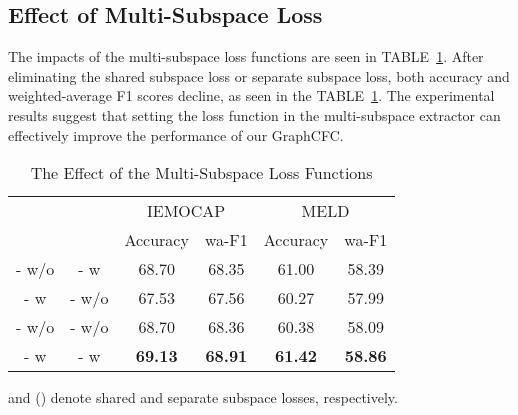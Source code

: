 \documentclass[lettersize,journal]{IEEEtran}
\begin{document}
\subsection{Effect of Multi-Subspace Loss}
The impacts of the multi-subspace loss functions are seen in TABLE~\ref{tab:muti-subspace}. After eliminating the shared subspace loss or separate subspace loss, both accuracy and weighted-average F1 scores decline, as seen in the TABLE~\ref{tab:muti-subspace}. The experimental results suggest that setting the loss function in the multi-subspace extractor can effectively improve the performance of our GraphCFC.
\begin{table}[htbp]
\centering
\renewcommand{\arraystretch}{1.0}
\setlength{\tabcolsep}{7pt}
\caption{The Effect of the Multi-Subspace Loss Functions}
\begin{threeparttable}
\begin{tabular}{c|c|cc||cc}
\hline
\multicolumn{1}{c|}{\multirow{2}[0]{*}{}} & \multicolumn{1}{c|}{\multirow{2}[0]{*}{}}& \multicolumn{2}{c||}{IEMOCAP} & \multicolumn{2}{c}{MELD} \\
\cline{3-6}
& & Accuracy & wa-F1 & Accuracy & wa-F1 \\
\hline
- w/o & - w & 68.70  & 68.35  & 61.00  & 58.39  \\
- w & - w/o & 67.53  & 67.56  & 60.27  & 57.99  \\
- w/o & - w/o & 68.70  & 68.36  & 60.38  & 58.09  \\
\hline
- w & - w & \textbf{69.13}  & \textbf{68.91}  & \textbf{61.42}  & \textbf{58.86}  \\
\hline
\end{tabular}\label{tab:muti-subspace} and  () denote shared and separate subspace losses, respectively.
\end{threeparttable}
\end{table}
\end{document}

